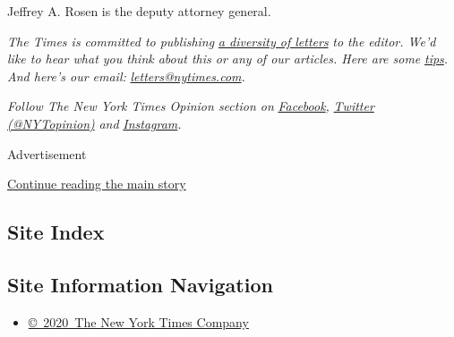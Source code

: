 Jeffrey A. Rosen is the deputy attorney general.

\emph{The Times is committed to publishing}
\href{https://www.nytimes.com/2019/01/31/opinion/letters/letters-to-editor-new-york-times-women.html}{\emph{a
diversity of letters}} \emph{to the editor. We'd like to hear what you
think about this or any of our articles. Here are some}
\href{https://help.nytimes.com/hc/en-us/articles/115014925288-How-to-submit-a-letter-to-the-editor}{\emph{tips}}\emph{.
And here's our email:}
\href{mailto:letters@nytimes.com}{\emph{letters@nytimes.com}}\emph{.}

\emph{Follow The New York Times Opinion section on}
\href{https://www.facebook.com/nytopinion}{\emph{Facebook}}\emph{,}
\href{http://twitter.com/NYTOpinion}{\emph{Twitter (@NYTopinion)}}
\emph{and}
\href{https://www.instagram.com/nytopinion/}{\emph{Instagram}}\emph{.}

Advertisement

\protect\hyperlink{after-bottom}{Continue reading the main story}

\hypertarget{site-index}{%
\subsection{Site Index}\label{site-index}}

\hypertarget{site-information-navigation}{%
\subsection{Site Information
Navigation}\label{site-information-navigation}}

\begin{itemize}
\tightlist
\item
  \href{https://help.nytimes.com/hc/en-us/articles/115014792127-Copyright-notice}{©~2020~The
  New York Times Company}
\end{itemize}

